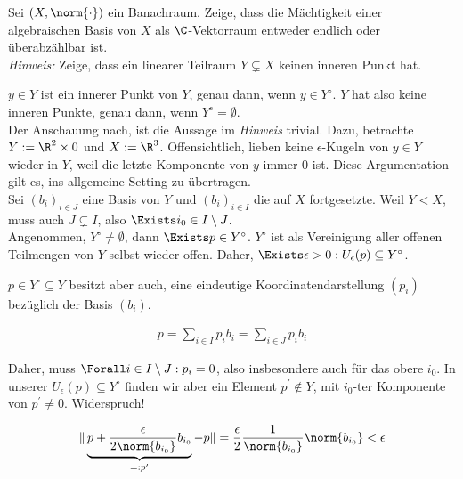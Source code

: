 \begin{exercise}

Sei $(X, \norm{\cdot})$ ein Banachraum.
Zeige, dass die Mächtigkeit einer algebraischen Basis von $X$ als $\C$-Vektorraum entweder endlich oder überabzählbar ist. \\

\textit{Hinweis:}
Zeige, dass ein linearer Teilraum $Y \subsetneq X$ keinen inneren Punkt hat.

\end{exercise}

\begin{solution}

$y \in Y$ ist ein innerer Punkt von $Y$, genau dann, wenn $y \in Y^\circ$.
$Y$ hat also keine inneren Punkte, genau dann, wenn $Y^\circ = \emptyset$. \\

Der Anschauung nach, ist die Aussage im \textit{Hinweis} trivial.
Dazu, betrachte $Y := \R^2 \times 0$ und $X := \R^3$.
Offensichtlich, lieben keine $\epsilon$-Kugeln von $y \in Y$ wieder in $Y$, weil die letzte Komponente von $y$ immer $0$ ist.
Diese Argumentation gilt es, ins allgemeine Setting zu übertragen. \\

Sei $(b_i)_{i \in J}$ eine Basis von $Y$ und $(b_i)_{i \in I}$ die auf $X$ fortgesetzte.
Weil $Y < X$, muss auch $J \subsetneq I$, also $\Exists i_0 \in I \setminus J$. \\

Angenommen, $Y^\circ \neq \emptyset$, dann $\Exists p \in Y^\circ$.
$Y^\circ$ ist als Vereinigung aller offenen Teilmengen von $Y$ selbst wieder offen.
Daher, $\Exists \epsilon > 0: U_\epsilon(p) \subseteq Y^\circ$.

$p \in Y^\circ \subseteq Y$ besitzt aber auch, eine eindeutige Koordinatendarstellung $(p_i)$ bezüglich der Basis $(b_i)$.

\begin{align*}
  p = \sum_{i \in I} p_i b_i
    = \sum_{i \in J} p_i b_i
\end{align*}

Daher, muss $\Forall i \in I \setminus J: p_i = 0$, also insbesondere auch für das obere $i_0$.
In unserer $U_\epsilon(p) \subseteq Y^\circ$ finden wir aber ein Element $p^\prime \notin Y$, mit $i_0$-ter Komponente von $p^\prime \neq 0$.
Widerspruch!

\begin{align*}
  \| \underbrace{p + \frac{\epsilon}{2 \norm{b_{i_0}}} b_{i_0}}_{=: p^\prime} - p \|
  =
  \frac{\epsilon}{2} \frac{1}{\norm{b_{i_0}}} \norm{b_{i_0}}
  <
  \epsilon
\end{align*}


\end{solution}
